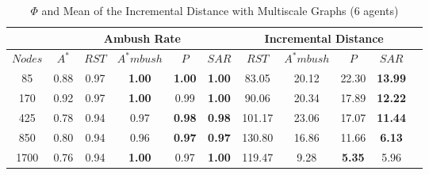 \begin{table}

\caption{$\Phi$ and Mean of the Incremental Distance 
		 with Multiscale Graphs (6 agents)}
\begin{center}

\begin{tabular}{|c|c|c|c|c|c||c|c|c|c|c|}
\hline
& \multicolumn{5}{|c||}{\textbf{Ambush Rate}} &
  \multicolumn{4}{|c|}{\textbf{Incremental Distance}}\\
\hline
  $Nodes$ & $A^*$ & $RST$ & $A^*mbush$ & $P$ & $SAR$
		  		  & $RST$ & $A^*mbush$ & $P$ & $SAR$\\
\hline
   85 & 0.88 & 0.97 & \textbf{1.00} & \textbf{1.00} & \textbf{1.00}
      & 83.05 & 20.12 & 22.30 & \textbf{13.99}\\
  170 & 0.92 & 0.97 & \textbf{1.00} & 0.99 & \textbf{1.00}
	  & 90.06 & 20.34 & 17.89 & \textbf{12.22}\\
  425 & 0.78 & 0.94 & 0.97 & \textbf{0.98} & \textbf{0.98}
	  & 101.17 & 23.06 & 17.07 & \textbf{11.44}\\
  850 & 0.80 & 0.94 & 0.96 & \textbf{0.97} & \textbf{0.97}
	  & 130.80 & 16.86 & 11.66 & \textbf{6.13}\\
 1700 & 0.76 & 0.94 & \textbf{1.00} & 0.97 & \textbf{1.00}
	  & 119.47 & 9.28 & \textbf{5.35} & 5.96\\
\hline
\end{tabular}

\label{tab:multiscale}
\end{center}
\end{table}